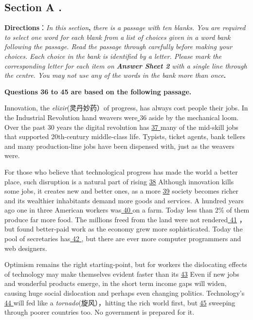 \documentclass[UTF8,11pt]{ctexart}
\begin{document}
\subsection*{\textbf{Section A} \textbf{.}}


\textbf{Directions}：\textit{In this section}\textbf{,}\textit{ there is a passage with ten blanks. You are required to select one word for each blank from a} \textit{list of choices given in a word bank following the passage. Read the passage through carefully before making your choices.} \textit{Each choice in the bank is identified by a letter. Please mark the corresponding letter for each item on}\textbf{\textit{ Answer Sheet 2}} \textit{with a single line through the centre. You may not use any of the words in the bank more than once}\textbf{.}


\textbf{Questions 36 to 45 are based on the following passage.}


Innovation, the\textit{ elixir}(灵丹妙药）of progress, has always cost people their jobs. In the Industrial Revolution hand weavers were\uline{ }36 aside by the mechanical loom. Over the past 30 years the digital revolution has \uline{37 }many of the mid-skill jobs that supported 20th-century middle-class life. Typists, ticket agents, bank tellers and many production-line jobs have been dispensed with, just as the weavers were.


For those who believe that technological progress has made the world a better place, such disruption is a natural part of rising \uline{38} Although innovation kills some jobs, it creates new and better ones, as a more \uline{39} society becomes richer and its wealthier inhabitants demand more goods and services. A hundred years ago one in three American workers was\uline{ 40 }on a farm. Today less than 2\% of them produce far more food. The millions freed from the land were not rendered\uline{ 41} ， but found better-paid work as the economy grew more sophisticated. Today the pool of secretaries has\uline{ 42 }, but there are ever more computer programmers and web designers.


Optimism remains the right starting-point, but for workers the dislocating effects of technology may make themselves evident faster than its \uline{43} Even if new jobs and wonderful products emerge, in the short term income gaps will widen, causing huge social dislocation and perhaps even changing politics. Technology’s\uline{ 44 }will fed like a\textit{ tornado}(旋风），hitting the rich world first, but \uline{45} sweeping through poorer countries too. No government is prepared for it. 
\end{document}
